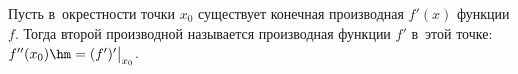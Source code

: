 
    Пусть в~окрестности точки $x_0$ существует конечная производная $f'(x)$ функции $f$. Тогда второй производной называется производная
    функции $f'$ в~этой точке: $f''(x_0)\hm=(f')'\big|_{x_0}$.
